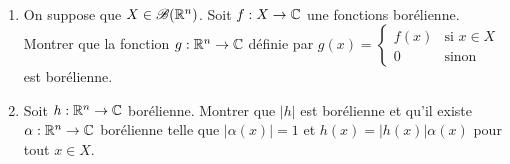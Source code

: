 \begin{td-exo}\label{exo_mesurabilite_extension}\,
\begin{enumerate}
        \item\label{exo_mesurabilite_extension_q1} On suppose que \(X\in\mathscr{B}(\mathbb{R}^n)\). Soit \(f:X\to\mathbb{C}\) une fonctions borélienne. Montrer que la fonction \(g:\mathbb{R}^n\to\mathbb{C}\) définie par
        \(
        g(x)=\begin{cases}
            f(x) & \mbox{si } x\in X \\
            0 & \mbox{sinon}
        \end{cases}
        \)
        est borélienne.
        
        \item Soit \(h:\mathbb{R}^n\to\mathbb{C}\) borélienne. Montrer que \(|h|\) est borélienne et qu'il existe \(\alpha:\mathbb{R}^n\to\mathbb{C}\) borélienne telle que \(|\alpha(x)|=1\) et \(h(x)=|h(x)|\alpha(x)\) pour tout \(x\in X\).
    \end{enumerate}
\end{td-exo}
